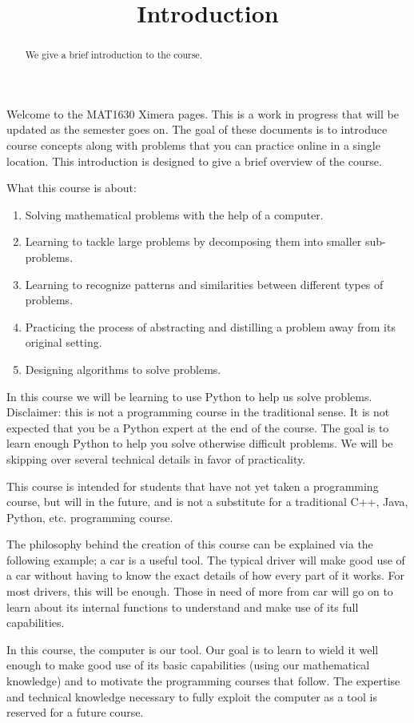 \documentclass{ximera}
\title{Introduction}
\begin{document}
  
\begin{abstract}  
We give a brief introduction to the course.
\end{abstract}  
\maketitle

Welcome to the MAT1630 Ximera pages. This is a work in progress that will be updated as the semester goes on. The goal of these documents is to introduce course concepts along with problems that you can practice online in a single location. 
This introduction is designed to give a brief overview of the course.

What this course is about:

\begin{enumerate}
	\item Solving mathematical problems with the help of a computer.
	\item Learning to tackle large problems by decomposing them into smaller sub-problems.
	\item Learning to recognize patterns and similarities between different types of problems.
	\item Practicing the process of abstracting and distilling a problem away from its original setting.
	\item Designing algorithms to solve problems.
\end{enumerate}

In this course we will be learning to use Python to help us solve problems. Disclaimer: this is not a programming course in the traditional sense. It is not expected that you be a Python expert at the end of the course. The goal is to learn enough Python to help you solve otherwise difficult problems. We will be skipping over several technical details in favor of practicality. 

This course is intended for students that have not yet taken a programming course, but will in the future, and is not a substitute for a traditional C++, Java, Python, etc. programming course. 

The philosophy behind the creation of this course can be explained via the following example; a car is a useful tool. The typical driver will make good use of a car without having to know the exact details of how every part of it works. For most drivers, this will be enough. Those in need of more from car will go on to learn about its internal functions to understand and make use of its full capabilities. 

In this course, the computer is our tool. Our goal is to learn to wield it well enough to make good use of its basic capabilities (using our mathematical knowledge) and to motivate the programming courses that follow. The expertise and technical knowledge necessary to fully exploit the computer as a tool is reserved for a future course. 
\end{document}
